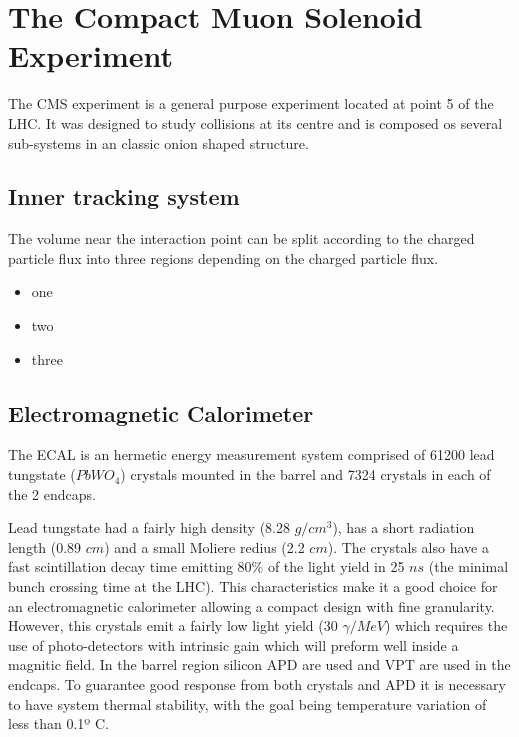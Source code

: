 \section{The Compact Muon Solenoid Experiment}
\label{SECTION:ExperimentalApparatus_CMS}

The \gls{CMS} experiment is a general purpose experiment located at point 5 of the \gls{LHC}. It was designed to study collisions at its centre and is composed os several sub-systems in an classic onion shaped structure.



\subsection{Inner tracking system}
\label{SUBSECTION:ExperimentalApparatus_CMS_Tracker}

The volume near the interaction point can be split according to the charged particle flux into three regions depending on the charged particle flux.

\begin{itemize}
  \item one
  \item two
  \item three
\end{itemize}


\subsection{Electromagnetic Calorimeter}
\label{SUBSECTION:ExperimentalApparatus_CMS_ECAL}

The \gls{ECAL} is an hermetic energy measurement system comprised of 61200 lead tungstate ($PbWO_4$) crystals mounted in the barrel and 7324 crystals in each of the 2 endcaps.

Lead tungstate had a fairly high density (8.28 $g/cm^3$), has a short radiation length (0.89 $cm$) and a small Moliere redius (2.2 $cm$). The crystals also have a fast scintillation decay time emitting 80\% of the light yield in 25 $ns$ (the minimal bunch crossing time at the LHC). This characteristics make it a good choice for an electromagnetic calorimeter allowing a compact design with fine granularity. However, this crystals emit a fairly low light yield (30 $\gamma/MeV$) which requires the use of photo-detectors with intrinsic gain which will preform well inside a magnitic field. In the barrel region silicon \gls{APD} are used and \gls{VPT} are used in the endcaps. To guarantee good response from both crystals and \gls{APD} it is necessary to have system thermal stability, with the goal being temperature variation of less than 0.1º C.

